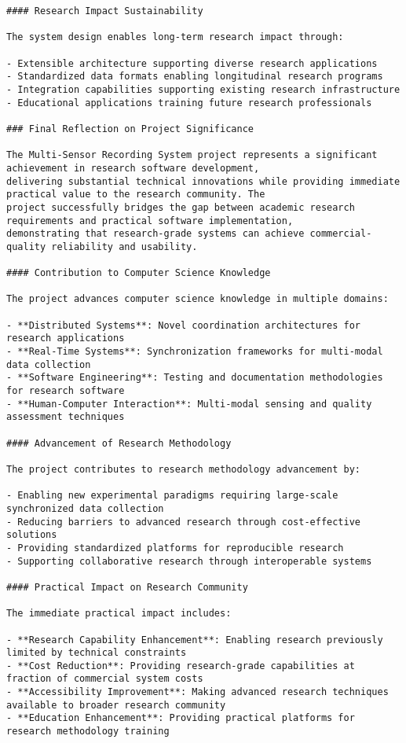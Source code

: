 \documentclass[12pt,a4paper]{report}
\begin{document}
\begin{verbatim}
#### Research Impact Sustainability

The system design enables long-term research impact through:

- Extensible architecture supporting diverse research applications
- Standardized data formats enabling longitudinal research programs
- Integration capabilities supporting existing research infrastructure
- Educational applications training future research professionals

### Final Reflection on Project Significance

The Multi-Sensor Recording System project represents a significant achievement in research software development,
delivering substantial technical innovations while providing immediate practical value to the research community. The
project successfully bridges the gap between academic research requirements and practical software implementation,
demonstrating that research-grade systems can achieve commercial-quality reliability and usability.

#### Contribution to Computer Science Knowledge

The project advances computer science knowledge in multiple domains:

- **Distributed Systems**: Novel coordination architectures for research applications
- **Real-Time Systems**: Synchronization frameworks for multi-modal data collection
- **Software Engineering**: Testing and documentation methodologies for research software
- **Human-Computer Interaction**: Multi-modal sensing and quality assessment techniques

#### Advancement of Research Methodology

The project contributes to research methodology advancement by:

- Enabling new experimental paradigms requiring large-scale synchronized data collection
- Reducing barriers to advanced research through cost-effective solutions
- Providing standardized platforms for reproducible research
- Supporting collaborative research through interoperable systems

#### Practical Impact on Research Community

The immediate practical impact includes:

- **Research Capability Enhancement**: Enabling research previously limited by technical constraints
- **Cost Reduction**: Providing research-grade capabilities at fraction of commercial system costs
- **Accessibility Improvement**: Making advanced research techniques available to broader research community
- **Education Enhancement**: Providing practical platforms for research methodology training


\end{verbatim}
\end{document}
